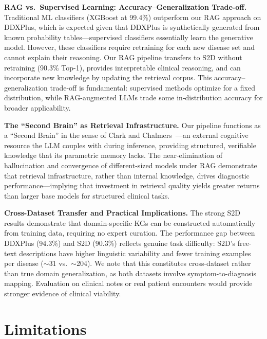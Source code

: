 \documentclass[runningheads]{llncs}
\begin{document}
\textbf{RAG vs.\ Supervised Learning: Accuracy--Generalization Trade-off.}
Traditional ML classifiers (XGBoost at 99.4\%) outperform our RAG approach on DDXPlus, which is expected given that DDXPlus is synthetically generated from known probability tables---supervised classifiers essentially learn the generative model. However, these classifiers require retraining for each new disease set and cannot explain their reasoning. Our RAG pipeline transfers to S2D without retraining (90.3\% Top-1), provides interpretable clinical reasoning, and can incorporate new knowledge by updating the retrieval corpus. This accuracy--generalization trade-off is fundamental: supervised methods optimize for a fixed distribution, while RAG-augmented LLMs trade some in-distribution accuracy for broader applicability.

\textbf{The ``Second Brain'' as Retrieval Infrastructure.}
Our pipeline functions as a ``Second Brain'' in the sense of Clark and Chalmers~\cite{clark1998extended}---an external cognitive resource the LLM couples with during inference, providing structured, verifiable knowledge that its parametric memory lacks. The near-elimination of hallucination and convergence of different-sized models under RAG demonstrate that retrieval infrastructure, rather than internal knowledge, drives diagnostic performance---implying that investment in retrieval quality yields greater returns than larger base models for structured clinical tasks.

\textbf{Cross-Dataset Transfer and Practical Implications.}
The strong S2D results demonstrate that domain-specific KGs can be constructed automatically from training data, requiring no expert curation. The performance gap between DDXPlus (94.3\%) and S2D (90.3\%) reflects genuine task difficulty: S2D's free-text descriptions have higher linguistic variability and fewer training examples per disease (${\sim}$31 vs.\ ${\sim}$204). We note that this constitutes cross-dataset rather than true domain generalization, as both datasets involve symptom-to-diagnosis mapping. Evaluation on clinical notes or real patient encounters would provide stronger evidence of clinical viability.

\section{Limitations}
\label{sec:limitations}
\end{document}
